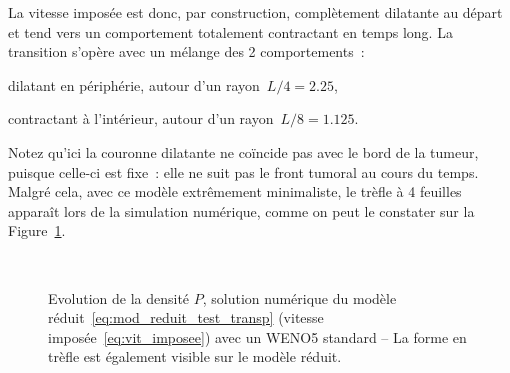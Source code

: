 \documentclass[main.tex]{subfiles}
\begin{document}
La vitesse imposée est donc, par construction, complètement dilatante au départ et tend vers un comportement totalement contractant en temps long. La transition s'opère avec un mélange des 2 comportements~:
\begin{myitemize}
\item dilatant en périphérie, autour d'un rayon~$L/4=2.25$,
\item contractant à l'intérieur, autour d'un rayon~$L/8=1.125$.
\end{myitemize}
Notez qu'ici la couronne dilatante ne coïncide pas avec le bord de la tumeur, puisque celle-ci est fixe~:  elle ne suit pas le front tumoral au cours du temps. 
Malgré cela, avec ce modèle extrêmement minimaliste, le trèfle à 4 feuilles apparaît lors de la simulation numérique, comme on peut le constater sur la Figure~\ref{fig:evo_test_transp}.
\begin{figure}
\centering
\\
\caption{Evolution de la densité $P$, solution numérique du modèle réduit~\eqref{eq:mod_reduit_test_transp} (vitesse imposée~\eqref{eq:vit_imposee}) avec un WENO5 standard -- La forme en trèfle est également visible sur le modèle réduit.\label{fig:evo_test_transp}}
\end{figure}
\end{document}
